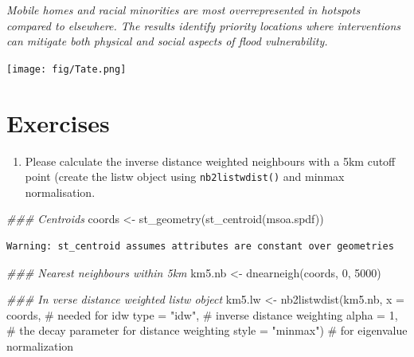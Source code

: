 \documentclass[
  letterpaper,
]{scrbook}
\newenvironment{Shaded}{\begin{snugshade}}{\end{snugshade}}
\newcommand{\AttributeTok}[1]{\textcolor[rgb]{0.40,0.45,0.13}{#1}}
\newcommand{\CommentTok}[1]{\textcolor[rgb]{0.37,0.37,0.37}{#1}}
\newcommand{\DecValTok}[1]{\textcolor[rgb]{0.68,0.00,0.00}{#1}}
\newcommand{\DocumentationTok}[1]{\textcolor[rgb]{0.37,0.37,0.37}{\textit{#1}}}
\newcommand{\FunctionTok}[1]{\textcolor[rgb]{0.28,0.35,0.67}{#1}}
\newcommand{\NormalTok}[1]{\textcolor[rgb]{0.00,0.23,0.31}{#1}}
\newcommand{\OtherTok}[1]{\textcolor[rgb]{0.00,0.23,0.31}{#1}}
\newcommand{\StringTok}[1]{\textcolor[rgb]{0.13,0.47,0.30}{#1}}
\providecommand{\tightlist}{%
  \setlength{\itemsep}{0pt}\setlength{\parskip}{0pt}}\usepackage{longtable,booktabs,array}
\begin{document}
\emph{Mobile homes and racial minorities are most overrepresented in
hotspots compared to elsewhere. The results identify priority locations
where interventions can mitigate both physical and social aspects of
flood vulnerability.}

\texttt{[image: fig/Tate.png]}

\hypertarget{exercises-1}{%
\section{Exercises}\label{exercises-1}}

\begin{enumerate}
\def\labelenumi{\arabic{enumi}.}
\tightlist
\item
  Please calculate the inverse distance weighted neighbours with a 5km
  cutoff point (create the listw object using \texttt{nb2listwdist()}
  and minmax normalisation.
\end{enumerate}

\begin{Shaded}
\begin{Highlighting}[]
\DocumentationTok{\#\#\# Centroids}
\NormalTok{coords }\OtherTok{\textless{}{-}} \FunctionTok{st\_geometry}\NormalTok{(}\FunctionTok{st\_centroid}\NormalTok{(msoa.spdf))}
\end{Highlighting}
\end{Shaded}

\begin{verbatim}
Warning: st_centroid assumes attributes are constant over geometries
\end{verbatim}

\begin{Shaded}
\begin{Highlighting}[]
\DocumentationTok{\#\#\# Nearest neighbours within 5km}
\NormalTok{km5.nb }\OtherTok{\textless{}{-}} \FunctionTok{dnearneigh}\NormalTok{(coords, }\DecValTok{0}\NormalTok{, }\DecValTok{5000}\NormalTok{)}

\DocumentationTok{\#\#\# In verse distance weighted listw object}
\NormalTok{km5.lw }\OtherTok{\textless{}{-}} \FunctionTok{nb2listwdist}\NormalTok{(km5.nb,}
                       \AttributeTok{x =}\NormalTok{ coords, }\CommentTok{\# needed for idw}
                       \AttributeTok{type =} \StringTok{"idw"}\NormalTok{, }\CommentTok{\# inverse distance weighting}
                       \AttributeTok{alpha =} \DecValTok{1}\NormalTok{, }\CommentTok{\# the decay parameter for distance weighting}
                       \AttributeTok{style =} \StringTok{"minmax"}\NormalTok{) }\CommentTok{\# for eigenvalue normalization}
\end{Highlighting}
\end{Shaded}
\end{document}
